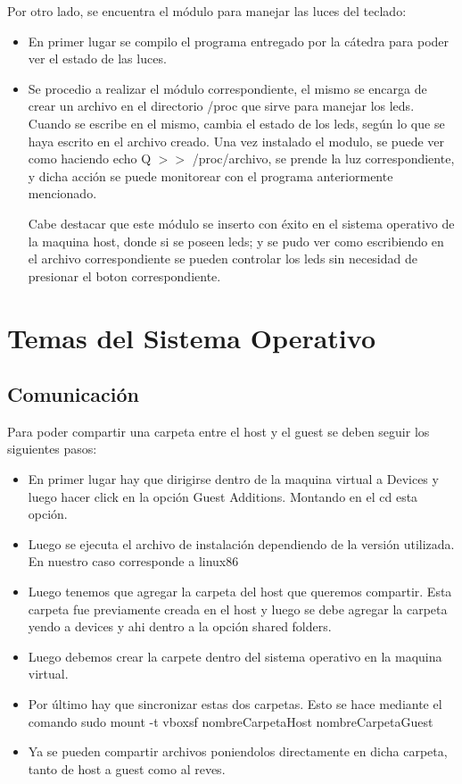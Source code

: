 \documentclass[a4paper, 12pt]{article}
\begin{document}
Por otro lado, se encuentra el m\'odulo para manejar las luces del teclado:
\begin{itemize}
\item En primer lugar se compilo el programa entregado por la c\'atedra para poder ver el estado de las luces.
\item Se procedio a realizar el m\'odulo correspondiente, el mismo se encarga de crear un archivo en el directorio /proc que sirve para manejar los leds. Cuando se escribe en el mismo, cambia el estado de los leds, seg\'un lo que se haya escrito en el archivo creado. Una vez instalado el modulo, se puede ver como haciendo echo Q $>>$ /proc/archivo, se prende la luz correspondiente, y dicha acci\'on se puede monitorear con el programa anteriormente mencionado. 

Cabe destacar que este m\'odulo se inserto con \'exito en el sistema operativo de la maquina host, donde si se poseen leds; y se pudo ver como escribiendo en el archivo correspondiente se pueden controlar los leds sin necesidad de presionar el boton correspondiente.
\end{itemize}



\section*{Temas del Sistema Operativo}

\subsection*{Comunicaci\'on}

Para poder compartir una carpeta entre el host y el guest se deben seguir los siguientes pasos:

\begin{itemize}
\item En primer lugar hay que dirigirse dentro de la maquina virtual a Devices y luego hacer click en la opci\'on Guest Additions. Montando en el cd esta opci\'on.
\item Luego se ejecuta el archivo de instalaci\'on dependiendo de la versi\'on utilizada. En nuestro caso corresponde a linux86
\item Luego tenemos que agregar la carpeta del host que queremos compartir. Esta carpeta fue previamente creada en el host y luego se debe agregar la carpeta yendo a devices y ahi dentro a la opci\'on shared folders. 
\item Luego debemos crear la carpete dentro del sistema operativo en la maquina virtual.
\item Por \'ultimo hay que sincronizar estas dos carpetas. Esto se hace mediante el comando sudo mount -t vboxsf nombreCarpetaHost nombreCarpetaGuest
\item Ya se pueden compartir archivos poniendolos directamente en dicha carpeta, tanto de host a guest como al reves. 
\end{itemize}
\end{document}
